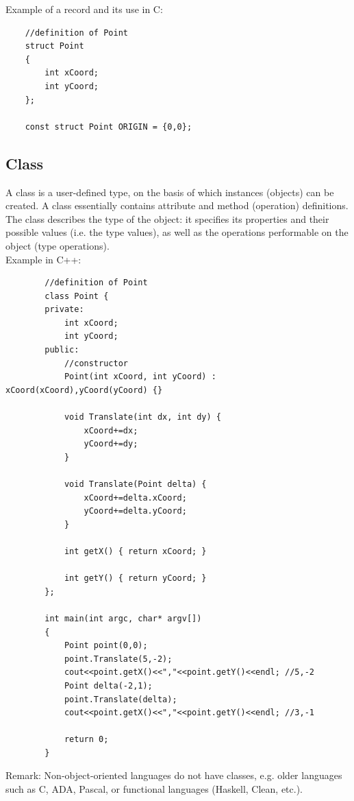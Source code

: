 \documentclass[margin=0px]{article}
\begin{document}
\noindent Example of a record and its use in C:
\begin{verbatim}
    //definition of Point
    struct Point
    {
        int xCoord;
        int yCoord;
    };

    const struct Point ORIGIN = {0,0};

\end{verbatim}

\subsection{Class}

A class is a user-defined type, on the basis of which instances (objects)
can be created. A class essentially contains attribute and method (operation)
definitions. The class describes the type of the object: it specifies its properties and their
possible values (i.e. the type values), as well as the operations performable on the object (type operations).\\

\noindent Example in C++:
\begin{verbatim}
        //definition of Point
        class Point {
        private:
            int xCoord;
            int yCoord;
        public:
            //constructor
            Point(int xCoord, int yCoord) : xCoord(xCoord),yCoord(yCoord) {}

            void Translate(int dx, int dy) {
                xCoord+=dx;
                yCoord+=dy;
            }

            void Translate(Point delta) {
                xCoord+=delta.xCoord;
                yCoord+=delta.yCoord;
            }

            int getX() { return xCoord; }

            int getY() { return yCoord; }
        };

        int main(int argc, char* argv[])
        {
            Point point(0,0);
            point.Translate(5,-2);
            cout<<point.getX()<<","<<point.getY()<<endl; //5,-2
            Point delta(-2,1);
            point.Translate(delta);
            cout<<point.getX()<<","<<point.getY()<<endl; //3,-1

            return 0;
        }
        \end{verbatim}

Remark: Non-object-oriented languages do not have classes, e.g. older languages such as C, ADA, Pascal, or
functional languages (Haskell, Clean, etc.).
\end{document}
